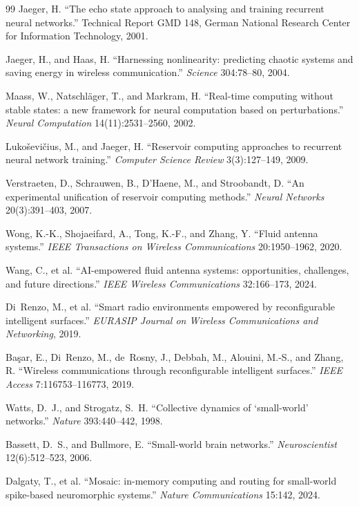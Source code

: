\documentclass[11pt, a4paper]{article}
\theoremstyle{definition}
\theoremstyle{remark}
\begin{document}
\begin{thebibliography}{99}
Jaeger, H.
``The echo state approach to analysing and training recurrent neural
networks.''
Technical Report GMD 148, German National Research Center for Information
Technology, 2001.

Jaeger, H., and Haas, H.
``Harnessing nonlinearity: predicting chaotic systems and saving energy in
wireless communication.''
\textit{Science} 304:78--80, 2004.

Maass, W., Natschl\"{a}ger, T., and Markram, H.
``Real-time computing without stable states: a new framework for neural
computation based on perturbations.''
\textit{Neural Computation} 14(11):2531--2560, 2002.

Luko\v{s}evi\v{c}ius, M., and Jaeger, H.
``Reservoir computing approaches to recurrent neural network training.''
\textit{Computer Science Review} 3(3):127--149, 2009.

Verstraeten, D., Schrauwen, B., D'Haene, M., and Stroobandt, D.
``An experimental unification of reservoir computing methods.''
\textit{Neural Networks} 20(3):391--403, 2007.

Wong, K.-K., Shojaeifard, A., Tong, K.-F., and Zhang, Y.
``Fluid antenna systems.''
\textit{IEEE Transactions on Wireless Communications} 20:1950--1962, 2020.

Wang, C., et al.
``AI-empowered fluid antenna systems: opportunities, challenges, and future
directions.''
\textit{IEEE Wireless Communications} 32:166--173, 2024.

Di~Renzo, M., et al.
``Smart radio environments empowered by reconfigurable intelligent surfaces.''
\textit{EURASIP Journal on Wireless Communications and Networking}, 2019.

Ba\c{s}ar, E., Di~Renzo, M., de~Rosny, J., Debbah, M., Alouini, M.-S.,
and Zhang, R.
``Wireless communications through reconfigurable intelligent surfaces.''
\textit{IEEE Access} 7:116753--116773, 2019.

Watts, D.~J., and Strogatz, S.~H.
``Collective dynamics of `small-world' networks.''
\textit{Nature} 393:440--442, 1998.

Bassett, D.~S., and Bullmore, E.
``Small-world brain networks.''
\textit{Neuroscientist} 12(6):512--523, 2006.

Dalgaty, T., et al.
``Mosaic: in-memory computing and routing for small-world spike-based
neuromorphic systems.''
\textit{Nature Communications} 15:142, 2024.


\end{thebibliography}
\end{document}
